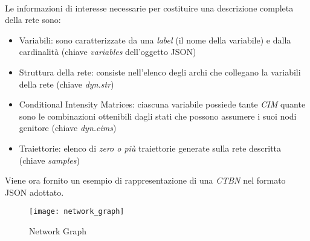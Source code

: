   \paragraph{}
  Le informazioni di interesse necessarie per costituire una descrizione completa della rete sono:
  \begin{itemize}
    \item Variabili: sono caratterizzate da una \textit{label} (il nome della variabile) e dalla cardinalità
      (chiave \textit{variables} dell'oggetto JSON)
    \item Struttura della rete: consiste nell'elenco degli archi che collegano la variabili della rete
      (chiave \textit{dyn.str})
    \item Conditional Intensity Matrices: ciascuna variabile possiede tante \textit{CIM} quante sono le 
      combinazioni ottenibili dagli stati che possono assumere i suoi nodi genitore (chiave \textit{dyn.cims})
    \item Traiettorie: elenco di \textit{zero o più} traiettorie generate sulla rete descritta (chiave \textit{samples})
  \end{itemize}

  Viene ora fornito un esempio di rappresentazione di una \textit{CTBN} nel formato JSON
  adottato.
  
  \begin{figure}[H]
    \texttt{[image: network\_graph]}
    \centering
    \caption{Network Graph}
    \label{fig:network_graph}
  \end{figure}

